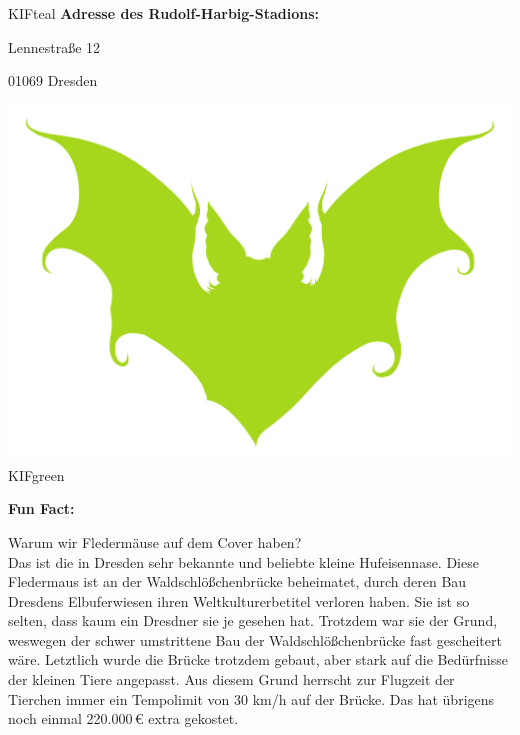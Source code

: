 \begin{awesomeblock}[KIFteal]{2pt}{\faQuestion}{KIFteal}
    \textbf{Adresse des Rudolf-Harbig-Stadions:}

    Lennestraße 12

    01069 Dresden
\end{awesomeblock}


\vfill

\begin{awesomeblock}[KIFgreen]{2pt}{\includegraphics[width=.1\textwidth]{img/fledermaus.pdf}}{KIFgreen}
\begin{minipage}[t]{.82\textwidth}
  \footnotesize\textbf{Fun Fact:}

  Warum wir Fledermäuse auf dem Cover haben?\\

  Das ist die in Dresden sehr bekannte und beliebte kleine Hufeisennase.
  Diese Fledermaus ist an der Waldschlößchenbrücke beheimatet, durch deren Bau Dresdens Elbuferwiesen ihren Weltkulturerbetitel verloren haben. Sie ist so selten, dass kaum ein Dresdner sie je gesehen hat. Trotzdem war sie der Grund, weswegen der schwer umstrittene Bau der Waldschlößchenbrücke fast gescheitert wäre.
  Letztlich wurde die Brücke trotzdem gebaut, aber stark auf die Bedürfnisse der kleinen Tiere angepasst.
  Aus diesem Grund herrscht zur Flugzeit der Tierchen immer ein Tempolimit von 30 km/h auf der Brücke. Das hat übrigens noch einmal 220.000\,€ extra gekostet.
\end{minipage}
\end{awesomeblock}
